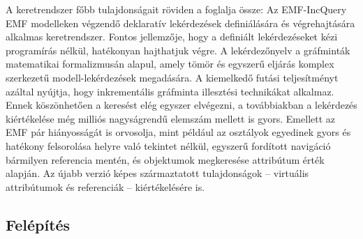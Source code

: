 A keretrendszer főbb tulajdonságait röviden a \cite{EMFIncQuery} foglalja össze:
Az EMF-IncQuery \gls{EMF} modelleken végzendő deklaratív lekérdezések definiálására és végrehajtására alkalmas keretrendszer.
Fontos jellemzője, hogy a definiált lekérdezéseket kézi programírás nélkül, hatékonyan hajthatjuk végre.
A lekérdezőnyelv a gráfminták matematikai formalizmusán alapul, amely tömör és egyszerű eljárás komplex szerkezetű modell-lekérdezések megadására.
A kiemelkedő futási teljesítményt azáltal nyújtja, hogy inkrementális gráfminta illesztési technikákat alkalmaz.
Ennek köszönhetően a keresést elég egyszer elvégezni, a továbbiakban a lekérdezés kiértékelése még milliós nagyságrendű elemszám mellett is gyors.
Emellett az \gls{EMF} pár hiányosságát is orvosolja, mint például az osztályok egyedinek gyors és hatékony felsorolása helyre való tekintet nélkül, egyszerű fordított navigáció bármilyen referencia mentén, és objektumok megkeresése attribútum érték alapján.
Az újabb verzió képes származtatott tulajdonságok -- virtuális attribútumok és referenciák -- kiértékelésére is.

\subsection{Felépítés}

